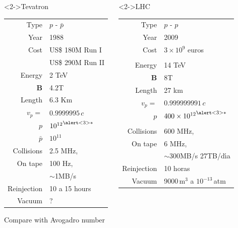 \documentclass[%
xcolor=pdftex,dvipsnames,table%
]{beamer}
\begin{document}
{\begin{frame}
\begin{columns}
   \begin{block}<2->{Tevatron}
     \begin{tabular}{r l}
       Type                    & $p$ - $\bar{p}$\\
       Year                     &1988\\
       Cost                   &US\$ 180M Run I\\
                               &US\$ 290M Run II\\
       Energy                 &2 TeV\\
       $\mathbf{B}$            & 4.2T\\ 
       Length                &6.3 Km\\
       $v_p=$                   & $0.9999995\,c$\\
       $p$                     & ${10^{12}}^{\alert<3>{*}}$ \\
       $\bar{p}$               & $10^{11}$\\
       Collisions             & 2.5 MHz, \\
       On tape                & 100 Hz,\\
                               & $\sim$1MB/s\\
       Reinjection             & 10 a 15 hours\\
       Vacuum                   & ? \\
     \end{tabular}
  \alert<3>{\tiny * Compare with Avogadro number}
   \end{block}
   \begin{block}<2->{LHC}
     \begin{tabular}{r l}
       Type                    & $p$ - $p$\\
       Year                     &2009\\
       Cost                   &$3\times10^{9}$ euros\\
       &\\
       Energy                 &14 TeV\\
       $\mathbf{B}$            & 8T\\ 
       Length               &27 km\\
       $v_p=$                   & $0.999999991\,c$\\
       $p$                     & ${400\times10^{12}}^{\alert<3>{*}}$ \\
                               & \\
       Collisions              & 600 MHz, \\
       On tape                & 6 MHz, \\
                               &$\sim$300MB/s 27TB/d\'\i a\\
       Reinjection             & 10  horas\\
       Vacuum                   & 9000$\,\text{m}^3$ a $10^{-13}\,$atm \\
     \end{tabular}


\end{block}
\end{columns}
\end{frame}}
\end{document}
